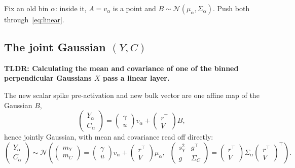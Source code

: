 \documentclass[11pt]{article}
\newcommand{\N}{\mathcal{N}}
\begin{document}
Fix an old bin $\alpha$: inside it, $A = v_\alpha$ is a point and $B \sim \N(\mu_\alpha, \Sigma_\alpha)$. Push both through~\eqref{eq:linear}.

\subsection{The joint Gaussian $(Y, C)$}

\textbf{TLDR: Calculating the mean and covariance of one of the binned perpendicular Gaussians $X$ pass a linear layer.}

The new scalar spike pre-activation and new bulk vector are one affine map of the Gaussian $B$,
\[
\begin{pmatrix} Y_\alpha \\ C_\alpha \end{pmatrix}
= \begin{pmatrix} \gamma \\ u \end{pmatrix} v_\alpha
+ \begin{pmatrix} r^\top \\ V \end{pmatrix} B,
\]
hence jointly Gaussian, with mean and covariance read off directly:
\begin{equation}
\begin{pmatrix} Y_\alpha \\ C_\alpha \end{pmatrix}
\sim \N\!\left(
\begin{pmatrix} m_Y \\ m_C \end{pmatrix}
= \begin{pmatrix} \gamma \\ u \end{pmatrix} v_\alpha
+ \begin{pmatrix} r^\top \\ V \end{pmatrix} \mu_\alpha ,\;\;
\begin{pmatrix} s_Y^2 & g^\top \\ g & \Sigma_C \end{pmatrix}
= \begin{pmatrix} r^\top \\ V \end{pmatrix} \Sigma_\alpha
  \begin{pmatrix} r^\top \\ V \end{pmatrix}^{\!\top}
\right).
\label{eq:jointYC}
\end{equation}
\end{document}
